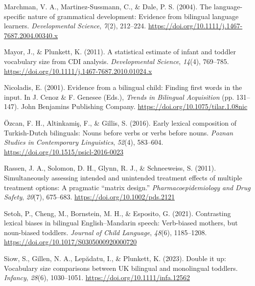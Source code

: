 \documentclass[10pt, letterpaper]{article}
\begin{document}
\begin{CSLReferences}{1}{0}
Marchman, V. A., Martinez-Sussmann, C., \& Dale, P. S. (2004). The
language-specific nature of grammatical development: Evidence from
bilingual language learners. \emph{Developmental Science}, \emph{7}(2),
212--224. \url{https://doi.org/10.1111/j.1467-7687.2004.00340.x}

Mayor, J., \& Plunkett, K. (2011). A statistical estimate of infant and
toddler vocabulary size from {CDI} analysis. \emph{Developmental
Science}, \emph{14}(4), 769--785.
\url{https://doi.org/10.1111/j.1467-7687.2010.01024.x}

Nicoladis, E. (2001). Evidence from a bilingual child: {Finding} first
words in the input. In J. Cenoz \& F. Genesee (Eds.), \emph{Trends in
{Bilingual Acquisition}} (pp. 131--147). John Benjamins Publishing
Company. \url{https://doi.org/10.1075/tilar.1.08nic}

Özcan, F. H., Altinkamiş, F., \& Gillis, S. (2016). Early lexical
composition of {Turkish-Dutch} bilinguals: {Nouns} before verbs or verbs
before nouns. \emph{Poznan Studies in Contemporary Linguistics},
\emph{52}(4), 583--604. \url{https://doi.org/10.1515/psicl-2016-0023}

Rassen, J. A., Solomon, D. H., Glynn, R. J., \& Schneeweiss, S. (2011).
Simultaneously assessing intended and unintended treatment effects of
multiple treatment options: A pragmatic {``matrix design.''}
\emph{Pharmacoepidemiology and Drug Safety}, \emph{20}(7), 675--683.
\url{https://doi.org/10.1002/pds.2121}

Setoh, P., Cheng, M., Bornstein, M. H., \& Esposito, G. (2021).
Contrasting lexical biases in bilingual {English}--{Mandarin} speech:
{Verb-biased} mothers, but noun-biased toddlers. \emph{Journal of Child
Language}, \emph{48}(6), 1185--1208.
\url{https://doi.org/10.1017/S0305000920000720}

Siow, S., Gillen, N. A., Lepădatu, I., \& Plunkett, K. (2023). Double it
up: {Vocabulary} size comparisons between {UK} bilingual and monolingual
toddlers. \emph{Infancy}, \emph{28}(6), 1030--1051.
\url{https://doi.org/10.1111/infa.12562}


\end{CSLReferences}
\end{document}
